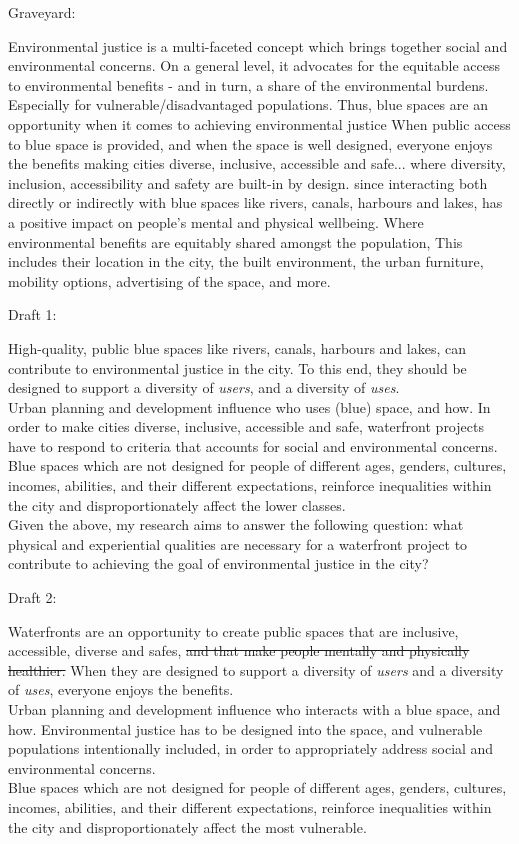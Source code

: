 \documentclass{article}
\begin{document}
Graveyard:
\begin{outline}
	\1 Environmental justice is a multi-faceted concept which brings together social and environmental concerns. On a general level, it advocates for the equitable access to environmental benefits - and in turn, a share of the environmental burdens.
	\1 Especially for vulnerable/disadvantaged populations. Thus, blue spaces are an opportunity when it comes to achieving environmental justice
	\1 When public access to blue space is provided, and when the space is well designed, everyone enjoys the benefits
	\1 making cities diverse, inclusive, accessible and safe... where diversity, inclusion, accessibility and safety are built-in by design.
	\1 since interacting both directly or indirectly with blue spaces like rivers, canals, harbours and lakes, has a positive impact on people's mental and physical wellbeing. 
	\1  Where environmental benefits are equitably shared amongst the population, 
	\1 This includes their location in the city, the built environment, the urban furniture, mobility options, advertising of the space, and more.
\end{outline}

Draft 1:

High-quality, public blue spaces like rivers, canals, harbours and lakes, can contribute to environmental justice in the city.
To this end, they should be designed to support a diversity of \textit{users}, and a diversity of \textit{uses}.\\
Urban planning and development influence who uses (blue) space, and how.
In order to make cities diverse, inclusive, accessible and safe, waterfront projects have to respond to criteria that accounts for social and environmental concerns.\\
Blue spaces which are not designed for people of different ages, genders, cultures, incomes, abilities, and their different expectations, reinforce inequalities within the city and disproportionately affect the lower classes.\\

Given the above, my research aims to answer the following question: 
what physical and experiential qualities are necessary for a waterfront project to contribute to achieving the goal of environmental justice in the city?

Draft 2:

Waterfronts are an opportunity to create public spaces that are inclusive, accessible, diverse and safes, \sout{and that make people mentally and physically healthier.} When they are designed to support a diversity of \textit{users} and a diversity of \textit{uses}, everyone enjoys the benefits.\\
Urban planning and development influence who interacts with a blue space, and how. Environmental justice has to be designed into the space, and vulnerable populations intentionally included, in order to appropriately address social and environmental concerns.\\
Blue spaces which are not designed for people of different ages, genders, cultures, incomes, abilities, and their different expectations, reinforce inequalities within the city and disproportionately affect the most vulnerable.
\end{document}
